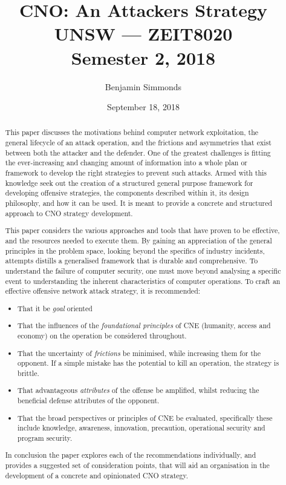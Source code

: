\documentclass[11pt]{report}
\begin{document}
\title{CNO: An Attackers Strategy \\
	\vspace{14pt}
	\large UNSW --- ZEIT8020 \\
	Semester 2, 2018
}
\author{Benjamin Simmonds}
\date{September 18, 2018}
\maketitle

\begin{abstract}
	This paper discusses the motivations behind computer network exploitation, the general lifecycle of an attack operation, and the frictions and asymmetries that exist between both the attacker and the defender. One of the greatest challenges is fitting the ever-increasing and changing amount of information into a whole plan or framework to develop the right strategies to prevent such attacks. Armed with this knowledge seek out the creation of a structured general purpose framework for developing offensive strategies, the components described within it, its design philosophy, and how it can be used. It is meant to provide a concrete and structured approach to CNO strategy development.

	This paper considers the various approaches and tools that have proven to be effective, and the resources needed to execute them. By gaining an appreciation of the general principles in the problem space, looking beyond the specifics of industry incidents, attempts distills a generalised framework that is durable and comprehensive. To understand the failure of computer security, one must move beyond analysing a specific event to understanding the inherent characteristics of computer operations. To craft an effective offensive network attack strategy, it is recommended:

	\begin{itemize}
		\item That it be \textit{goal} oriented
		\item That the influences of the \textit{foundational principles} of CNE (humanity, access and economy) on the  operation be considered throughout.
		\item That the uncertainty of \textit{frictions} be minimised, while increasing them for the opponent. If a simple mistake has the potential to kill an operation, the strategy is brittle.
		\item That advantageous \textit{attributes} of the offense be amplified, whilst reducing the beneficial defense  attributes of the opponent.
		\item That the broad perspectives or principles of CNE be evaluated, specifically these include knowledge, awareness, innovation, precaution, operational security and program security.
	\end{itemize}

	In conclusion the paper explores each of the recommendations individually, and provides a suggested set of consideration points, that will aid an organisation in the development of a concrete and opinionated CNO strategy.
\end{abstract}
\end{document}
